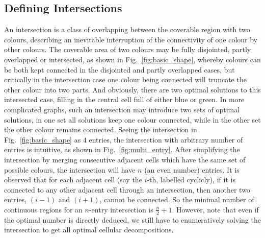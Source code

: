 \documentclass[conference]{IEEEtran}
\begin{document}
\subsection{Defining Intersections}
An intersection is a class of overlapping between the coverable region with two colours, describing an inevitable interruption of the connectivity of one colour 
by other colours. 
The coverable area of two colours may be fully disjointed, partly overlapped or intersected, as shown in Fig.~\ref{fig:basic_shape}, 
whereby colours can be both kept connected in the disjointed and partly overlapped cases, but critically in the intersection case one colour being connected will truncate the other colour into two parts. 
And obviously, there are two optimal solutions to this intersected case, filling in the central cell full of either blue or green.
In more complicated graphs, such an intersection may introduce two sets of optimal solutions, in one set all solutions keep one colour connected, 
while in the other set the other colour remains connected. Seeing the intersection in Fig.~\ref{fig:basic_shape} as $4$ entries, the intersection with arbitrary number of entries is intuitive, as shown in Fig.~\ref{fig:multi_entry}. After simplifying the intersection by merging consecutive adjacent cells which have the same set of possible colours, the intersection will have $n$ (an even number) entries. 
It is observed that for each adjacent cell (say the $i$-th, labelled cyclicly), if it is connected to any other adjacent cell through an intersection, then another two entries, $(i-1)$ and $(i+1)$, cannot be connected. So the minimal number of continuous regions for an $n$-entry intersection is $\frac{n}{2}+1$. 
However, note that even if the optimal number is directly deduced, we still have to enumeratively solving the intersection to get all optimal cellular decompositions. 

\end{document}
